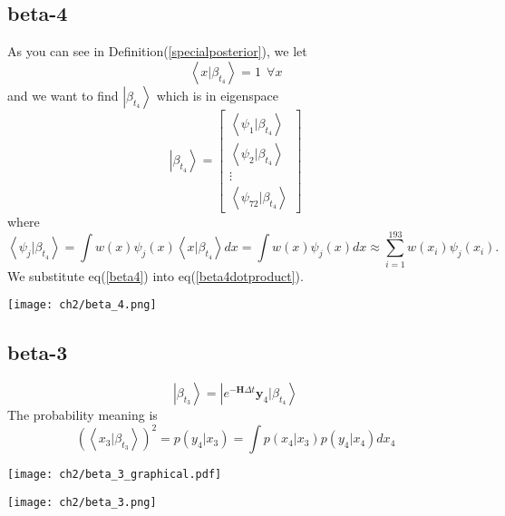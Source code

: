 \subsection{beta-4}
\begin{definition}
As you can see in Definition(\ref{specialposterior}), we let
\begin{equation}\label{beta4}
        \left<x|\beta_{t_4} \right>=1~~\forall x 
\end{equation}
and we want to find $\left|\beta_{t_4} \right> $ which is in eigenspace
\begin{equation}
        \left|\beta_{t_4} \right> = \begin{bmatrix}
                \left< \psi_1|\beta_{t_4} \right> \\ \left< \psi_2|\beta_{t_4} \right> \\ \vdots \\ 
                \left< \psi_{72}|\beta_{t_4} \right>
        \end{bmatrix} 
\end{equation}
where
\begin{equation}\label{beta4dotproduct}
        \left< \psi_j | \beta_{t_4} \right> = \int w(x) \psi_j(x)  \left<x|\beta_{t_4} \right> dx
        = \int w(x) \psi_j(x) dx \approx \sum_{i=1}^{193} w(x_i) \psi_j(x_i).
\end{equation}
We substitute eq(\ref{beta4}) into eq(\ref{beta4dotproduct}).
\begin{center}
        \texttt{[image: ch2/beta\_4.png]}
\end{center}
\end{definition}

\subsection{beta-3}
\begin{definition}
\begin{equation}
        \left|\beta_{t_3}  \right> =  \left| e^{-\textbf{H}\Delta t} \textbf{y}_4 |\beta_{t_4} \right>
\end{equation}
The probability meaning is
\begin{equation}
   \left( \left<x_3 |\beta_{t_3}  \right> \right)^2 = p(y_4 | x_3) = \int p(x_4 | x_3) p(y_4 | x_4) dx_4
\end{equation}
\begin{center}
        \texttt{[image: ch2/beta\_3\_graphical.pdf]}
\end{center}
\begin{center}
        \texttt{[image: ch2/beta\_3.png]}
\end{center}
\end{definition}

